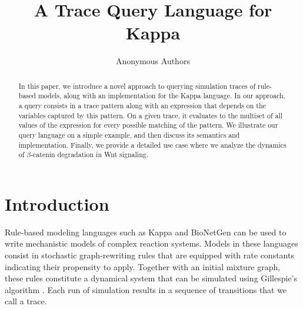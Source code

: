 \documentclass[runningheads]{llncs}
\begin{document}
\title{A Trace Query Language for Kappa}

\author{Anonymous Authors}




\maketitle


\begin{abstract}
  In this paper, we introduce a novel approach to querying
  simulation traces of rule-based models, along with an implementation
  for the Kappa language. In our approach, a query consists in a trace
  pattern along with an expression that depends on the variables
  captured by this pattern. On a given trace, it evaluates to the
  multiset of all values of the expression for every possible matching
  of the pattern. We illustrate our query language on a simple
  example, and then discuss its semantics and implementation. Finally,
  we provide a detailed use case where we analyze the dynamics of
  $\beta$-catenin degradation in Wnt signaling.

\end{abstract}


\section{Introduction}

Rule-based modeling languages such as Kappa \cite{DanosEtAl-CONCUR07}
and BioNetGen \cite{bngl} can be used to write mechanistic models of
complex reaction systems. Models in these languages consist in
stochastic graph-rewriting rules that are equipped with rate constants
indicating their propensity to apply. Together with an initial mixture
graph, these rules constitute a dynamical system that can be simulated
using Gillespie's algorithm
\cite{gillespie1977exact,DanosEtAl-APLAS07,BoutillierEK17}. Each run
of simulation results in a sequence of transitions that we call a
trace.
\end{document}
